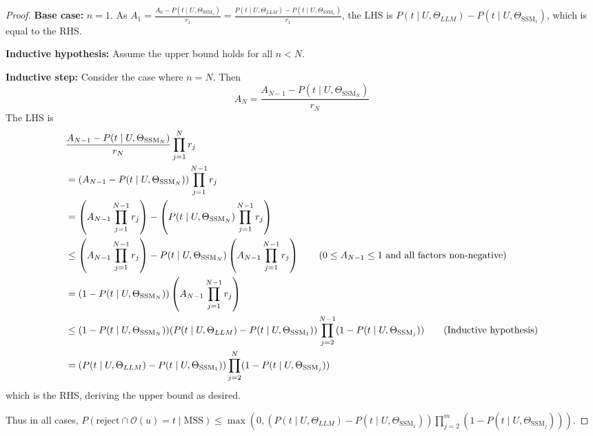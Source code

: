\begin{proof}
\textbf{Base case:} $n=1$. As $A_1 = \frac{A_0 - P(t \mid U, \Theta_{\textrm{SSM}_1})}{r_1} = \frac{P(t \mid U, \Theta_{LLM})-P(t \mid U, \Theta_{\textrm{SSM}_1})}{r_1}$, the LHS is $P(t \mid U, \Theta_{LLM}) - P(t \mid U, \Theta_{\textrm{SSM}_1})$, which is equal to the RHS.

\textbf{Inductive hypothesis:} Assume the upper bound holds for all $n < N$.

\textbf{Inductive step:} Consider the case where $n = N$. Then
\[
A_{N} = \frac{A_{N-1} - P(t \mid U, \Theta_{\textrm{SSM}_N})}{r_N}
\]
The LHS is
\begin{align*}
    &\frac{A_{N-1} - P(t \mid U, \Theta_{\textrm{SSM}_N})}{r_N}\prod_{j=1}^N r_j \\
	&= (A_{N-1} - P(t \mid U, \Theta_{\textrm{SSM}_N})) \prod_{j=1}^{N-1} r_j \\
	&= \left(A_{N-1}\prod_{j=1}^{N-1} r_j \right) - \left(P(t \mid U, \Theta_{\textrm{SSM}_N})\prod_{j=1}^{N-1} r_j \right) \\
    &\leq \left(A_{N-1}\prod_{j=1}^{N-1} r_j \right) - P(t \mid U, \Theta_{\textrm{SSM}_N})\left(A_{N-1} \prod_{j=1}^{N-1} r_j \right) \tag{$0 \leq A_{N-1} \leq 1$ and all factors non-negative}\\
	&= (1-P(t \mid U, \Theta_{\textrm{SSM}_N})) \left(A_{N-1}\prod_{j=1}^{N-1} r_j \right) \\
	&\leq (1-P(t \mid U, \Theta_{\textrm{SSM}_N})) (P(t \mid U, \Theta_{LLM}) - P(t \mid U, \Theta_{\textrm{SSM}_1}))
    \prod_{j=2}^{N-1} (1-P(t \mid U, \Theta_{\textrm{SSM}_j})) \tag{Inductive hypothesis} \\
	&= (P(t \mid U, \Theta_{LLM}) - P(t \mid U, \Theta_{\textrm{SSM}_1})) \prod_{j=2}^{N} (1-P(t \mid U, \Theta_{\textrm{SSM}_j}))
\end{align*}
which is the RHS, deriving the upper bound as desired.

Thus in all cases, $P(\textrm{reject} \cap \mathcal{O}(u)=t \mid \textrm{MSS}) \leq \max(0, (P(t \mid U, \Theta_{LLM})-P(t \mid U, \Theta_{\textrm{SSM}_1}))\prod_{j=2}^m (1-P(t \mid U, \Theta_{\textrm{SSM}_j})))$.


\end{proof}
